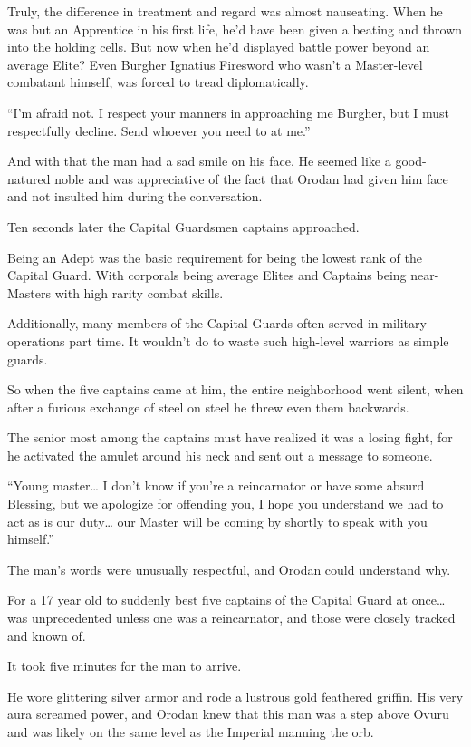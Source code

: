 \documentclass[a4paper,10pt]{book}
\begin{document}
Truly, the difference in treatment and regard was almost nauseating. When he was but an Apprentice in his first life, he’d have been given a beating and thrown into the holding cells. But now when he’d displayed battle power beyond an average Elite? Even Burgher Ignatius Firesword who wasn’t a Master-level combatant himself, was forced to tread diplomatically.\par
“I’m afraid not. I respect your manners in approaching me Burgher, but I must respectfully decline. Send whoever you need to at me.”\par
And with that the man had a sad smile on his face. He seemed like a good-natured noble and was appreciative of the fact that Orodan had given him face and not insulted him during the conversation.\par
Ten seconds later the Capital Guardsmen captains approached.\par
Being an Adept was the basic requirement for being the lowest rank of the Capital Guard. With corporals being average Elites and Captains being near-Masters with high rarity combat skills.\par
Additionally, many members of the Capital Guards often served in military operations part time. It wouldn’t do to waste such high-level warriors as simple guards.\par
So when the five captains came at him, the entire neighborhood went silent, when after a furious exchange of steel on steel he threw even them backwards.\par
The senior most among the captains must have realized it was a losing fight, for he activated the amulet around his neck and sent out a message to someone.\par
“Young master… I don’t know if you’re a reincarnator or have some absurd Blessing, but we apologize for offending you, I hope you understand we had to act as is our duty… our Master will be coming by shortly to speak with you himself.”\par
The man’s words were unusually respectful, and Orodan could understand why.\par
For a 17 year old to suddenly best five captains of the Capital Guard at once… was unprecedented unless one was a reincarnator, and those were closely tracked and known of.\par
\par
It took five minutes for the man to arrive.\par
He wore glittering silver armor and rode a lustrous gold feathered griffin. His very aura screamed power, and Orodan knew that this man was a step above Ovuru and was likely on the same level as the Imperial manning the orb.\par
\end{document}

